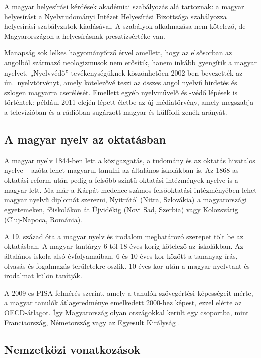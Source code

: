 \begin{multicols}{2}
  A magyar helyesírási kérdések akadémiai szabályozás alá tartoznak: a magyar helyesírást a Nyelvtudományi Intézet He\-lyes\-írá\-si Bizottsága szabályozza helyesírási szabályzatok kiadásával. A szabályok alkalmazása nem kötelező, de Magyarországon a helyesírásnak presz\-tízs\-ér\-té\-ke van.

  Manapság sok lelkes hagyományőrző érvel amellett, hogy az elsősorban az angolból származó neologizmusok nem erősítik, hanem inkább gyengítik a magyar nyelvet. „Nyelvvédő” tevékenységüknek köszönhetően 2002-ben bevezették az ún.\ nyelv\-tör\-vényt, amely kötelezővé teszi az összes angol nyelvű hirdetés és szlogen magyarra cserélését. Emellett egyéb nyelvművelő és -védő lépések is történtek: például 2011 elején lépett életbe az új mé\-dia\-tör\-vény, amely megszabja a televízióban és a rádióban sugárzott magyar és külföldi zenék arányát.

  \subsection{A magyar nyelv az oktatásban}

  A magyar nyelv 1844-ben lett a közigazgatás, a tudomány és az oktatás hivatalos nyelve -- azóta lehet magyarul tanulni az általános iskolákban is. Az 1868-as oktatási reform után pedig a felsőbb szintű oktatási intézmények nyelve is a magyar lett. Ma már a Kárpát-medence számos felsőoktatási intézményében lehet ma\-gyar nyelvű diplomát szerezni, Nyitrától (Nit\-ra, Szlovákia) a magyarországi egyetemeken, főiskolákon át Újvidékig (Novi Sad, Szerbia) vagy Kolozsvárig (Cluj-Napoca, Románia). 

  A 19. század óta a magyar nyelv és irodalom meghatározó szerepet tölt be az oktatásban. A magyar tantárgy 6-tól 18 éves korig kötelező az iskolákban. Az általános iskola alsó évfolyamaiban, 6 és 10 éves kor között a tananyag írás, olvasás és fogalmazás területekre oszlik. 10 éves kor után a magyar nyelvtant és irodalmat külön tanítják.  

  A 2009-es PISA felmérés  szerint, amely a tanulók szövegértési képességeit mérte, a magyar tanulók átlageredménye emel\-ke\-dett 2000-hez képest, ezzel elérte az OECD-átlagot. Így Magyarország olyan országokkal került egy csoportba, mint Franciaország, Németország vagy az Egye\-sült Királyság \cite{pisa}.    

  \subsection{Nemzetközi vonatkozások}


\end{multicols}
